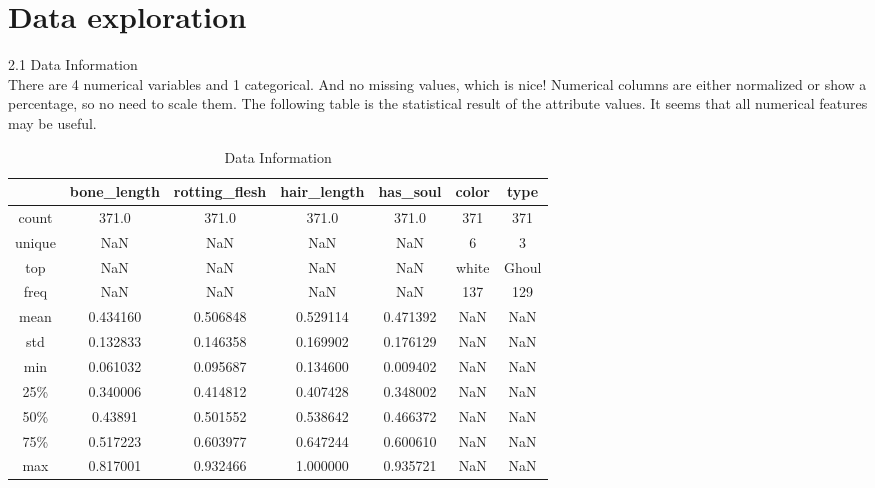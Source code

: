 \section{Data exploration} \label{sec-data_exploration}

2.1 Data Information\\
\hspace*{0.4cm}There are 4 numerical variables and 1 categorical. And no missing values, which is nice! Numerical columns are either normalized or show a percentage, so no need to scale them. The following table is the statistical result of the attribute values.
It seems that all numerical features may be useful.\\
\begin{table}[h]  \centering
	\caption{Data Information}
	\label{tbl:data information}
	\begin{tabular}{ccccccc}
		\hline
		& bone_length & rotting_flesh & hair_length & has_soul & color & type\\
		\hline
		count & 371.0 & 371.0 & 371.0 & 371.0 & 371 & 371 \\
		unique & NaN & NaN & NaN & NaN & 6 & 3 \\
		top & NaN & NaN & NaN & NaN & white & Ghoul \\
		freq & NaN & NaN & NaN & NaN & 137 & 129\\
		mean & 0.434160 & 0.506848 & 0.529114 & 0.471392 & NaN & NaN \\
		std & 0.132833 & 0.146358 & 0.169902 & 0.176129 & NaN & NaN \\
		min & 0.061032 & 0.095687 & 0.134600 & 0.009402 & NaN & NaN \\
		25\% & 0.340006 & 0.414812 & 0.407428 & 0.348002 & NaN & NaN \\
		50\% & 0.43891 & 0.501552 & 0.538642 & 0.466372 & NaN & NaN\\
		75\% & 0.517223 & 0.603977 & 0.647244 & 0.600610 & NaN & NaN\\
		max &  0.817001 & 0.932466 & 1.000000 & 0.935721 & NaN & NaN\\
		\hline 
	\end{tabular}
\end{table}


